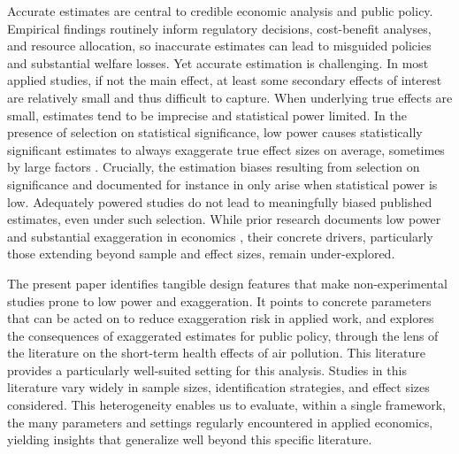 \documentclass[12pt]{article}
\begin{document}
\onehalfspacing




	
		Accurate estimates are central to credible economic analysis and public policy. Empirical findings routinely inform regulatory decisions, cost-benefit analyses, and resource allocation, so inaccurate estimates can lead to misguided policies and substantial welfare losses. Yet accurate estimation is challenging. In most applied studies, if not the main effect, at least some secondary effects of interest are relatively small and thus difficult to capture. When underlying true effects are small, estimates tend to be imprecise and statistical power limited. In the presence of selection on statistical significance, low power causes statistically significant estimates to always exaggerate true effect sizes on average, sometimes by large factors \citep{gelman_type_2000, ioannidis_why_2008, gelman_beyond_2014}. Crucially, the estimation biases resulting from selection on significance and documented for instance in \cite{andrews_identification_2019} only arise when statistical power is low. Adequately powered studies do not lead to meaningfully biased published estimates, even under such selection. While prior research documents low power and substantial exaggeration in economics \citep{ioannidis_power_2017, ferraro_feature_2020, young_consistency_2022}, their concrete drivers, particularly those extending beyond sample and effect sizes, remain under-explored.  
		
		The present paper identifies tangible design features that make non-experimental studies prone to low power and exaggeration. It points to concrete parameters that can be acted on to reduce exaggeration risk in applied work, and explores the consequences of exaggerated estimates for public policy, through the lens of the literature on the short-term health effects of air pollution. This literature provides a particularly well-suited setting for this analysis. Studies in this literature vary widely in sample sizes, identification strategies, and effect sizes considered. This heterogeneity enables us to evaluate, within a single framework, the many parameters and settings regularly encountered in applied economics, yielding insights that generalize well beyond this specific literature. 
		
\end{document}
